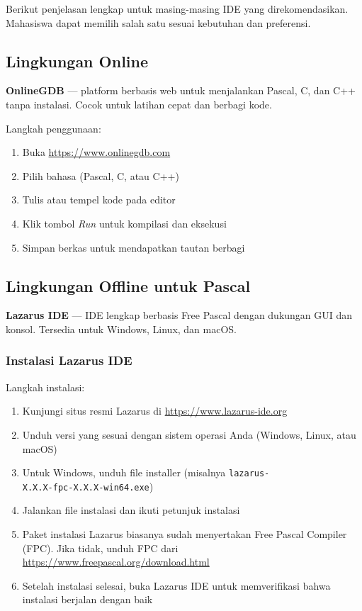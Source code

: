\documentclass[../main.tex]{subfiles}
\begin{document}
Berikut penjelasan lengkap untuk masing-masing IDE yang direkomendasikan. Mahasiswa dapat memilih salah satu sesuai kebutuhan dan preferensi.

\subsection{Lingkungan Online}
\textbf{OnlineGDB} \parencite{onlinegdb} — platform berbasis web untuk menjalankan Pascal, C, dan C++ tanpa instalasi. Cocok untuk latihan cepat dan berbagi kode.

Langkah penggunaan:
\begin{enumerate}
  \item Buka \url{https://www.onlinegdb.com}
  \item Pilih bahasa (Pascal, C, atau C++)
  \item Tulis atau tempel kode pada editor
  \item Klik tombol \emph{Run} untuk kompilasi dan eksekusi
  \item Simpan berkas untuk mendapatkan tautan berbagi
\end{enumerate}

\subsection{Lingkungan Offline untuk Pascal}
\textbf{Lazarus IDE} \parencite{lazarus} — IDE lengkap berbasis Free Pascal dengan dukungan GUI dan konsol. Tersedia untuk Windows, Linux, dan macOS.

\subsubsection{Instalasi Lazarus IDE}
Langkah instalasi:
\begin{enumerate}
  \item Kunjungi situs resmi Lazarus di \url{https://www.lazarus-ide.org}
  \item Unduh versi yang sesuai dengan sistem operasi Anda (Windows, Linux, atau macOS)
  \item Untuk Windows, unduh file installer (misalnya \texttt{lazarus-}\\\texttt{X.X.X-fpc-X.X.X-win64.exe})
  \item Jalankan file instalasi dan ikuti petunjuk instalasi
  \item Paket instalasi Lazarus biasanya sudah menyertakan Free Pascal Compiler (FPC). Jika tidak, unduh FPC dari \url{https://www.freepascal.org/download.html}
  \item Setelah instalasi selesai, buka Lazarus IDE untuk memverifikasi bahwa instalasi berjalan dengan baik
\end{enumerate}
\end{document}
